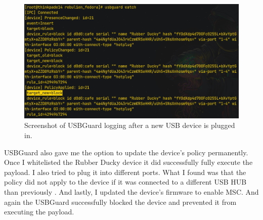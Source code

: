 \begin{figure}[ht]
    \centering
    \includegraphics[width=\linewidth]{./obrazky-figures/usbguard_watch.png}
    \caption{Screenshot of USBGuard logging after a new USB device is plugged in.}
    \label{fig:usbguard_device_blocked}
\end{figure}

USBGuard also gave me the option to update the device's policy permanently. Once I whitelisted the Rubber Ducky device it did successfully fully execute the payload. I also tried to plug it into different ports. What I found was that the policy did not apply to the device if it was connected to a different USB HUB than previously . And lastly, I updated the device's firmware to enable MSC. And again the USBGuard successfully blocked the device and prevented it from executing the payload.

